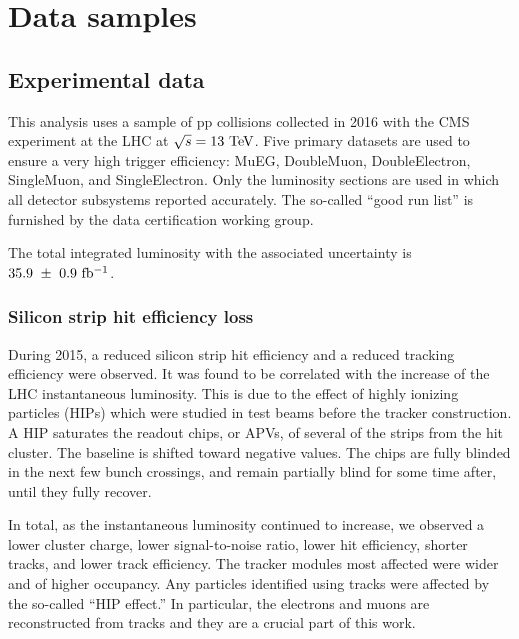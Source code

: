 \chapter{Data samples}
\section{Experimental data}
This analysis uses a sample of pp collisions collected in 2016 with the CMS 
experiment at the LHC at $\sqrt{s} = 13~\rm{TeV}$. Five primary datasets  
are used to ensure a very high trigger efficiency: MuEG, DoubleMuon, 
DoubleElectron, SingleMuon, and SingleElectron.
Only the luminosity sections are used in which all detector subsystems reported accurately.
The so-called ``good run list'' is furnished by the data certification working group.


The total integrated luminosity with the associated uncertainty is $35.9~\pm~0.9~\mathrm{fb^{-1}}$.

\subsection{Silicon strip hit efficiency loss}
\label{ss:hips}
During 2015, a reduced silicon strip hit efficiency and a reduced tracking efficiency were observed.
It was found to be correlated with the increase of the LHC instantaneous luminosity.
This is due to the effect of highly ionizing particles (HIPs) which were studied in test beams
before the tracker construction. A HIP saturates the readout chips, or APVs, of several of the strips from the hit cluster. 
The baseline is shifted toward negative values.
The chips are fully blinded in the next few bunch crossings, and remain partially blind for some time after, until they fully recover.

In total, as the instantaneous luminosity continued to increase, we observed a lower cluster charge, lower signal-to-noise ratio, lower hit efficiency, shorter tracks, and lower track efficiency.
The tracker modules most affected were wider and of higher occupancy. %
Any particles identified using tracks were affected by the so-called ``HIP effect.''
In particular, the electrons and muons are reconstructed from tracks and they are a crucial part of this work.

